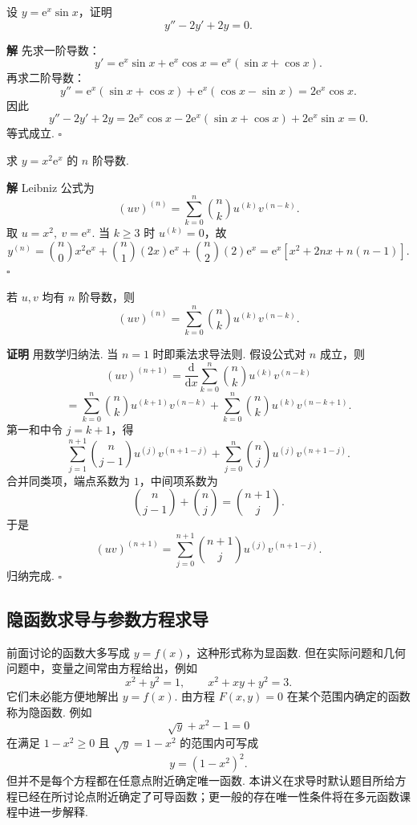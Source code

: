 \documentclass[fontset=fandol]{ctexart}
\newenvironment{proofdetail}{\par\noindent\textbf{证明}\quad}{\hfill$\square$\par\vspace{0.8em}}
\newenvironment{solution}{\par\noindent\textbf{解}\quad}{\hfill$\square$\par\vspace{0.8em}}
\newcommand{\dd}{\mathrm{d}}
\newcommand{\ee}{\mathrm{e}}
\begin{document}
\begin{example}[验证二阶导数关系]
设 $y=\ee^x\sin x$，证明
\[
y''-2y'+2y=0.
\]
\end{example}
\begin{solution}
先求一阶导数：
\[
y'=\ee^x\sin x+\ee^x\cos x=\ee^x(\sin x+\cos x).
\]
再求二阶导数：
\[
y''=\ee^x(\sin x+\cos x)+\ee^x(\cos x-\sin x)=2\ee^x\cos x.
\]
因此
\[
y''-2y'+2y
=2\ee^x\cos x-2\ee^x(\sin x+\cos x)+2\ee^x\sin x=0.
\]
等式成立.
\end{solution}

\begin{example}[Leibniz 公式]
求 $y=x^2\ee^x$ 的 $n$ 阶导数.
\end{example}
\begin{solution}
Leibniz 公式为
\[
(uv)^{(n)}=\sum_{k=0}^n\binom nk u^{(k)}v^{(n-k)}.
\]
取 $u=x^2,\ v=\ee^x$. 当 $k\geq3$ 时 $u^{(k)}=0$，故
\[
y^{(n)}=\binom n0x^2\ee^x+\binom n1(2x)\ee^x+\binom n2(2)\ee^x
=\ee^x\left[x^2+2nx+n(n-1)\right].
\]
\end{solution}

\begin{theorem}[Leibniz 公式]
若 $u,v$ 均有 $n$ 阶导数，则
\[
(uv)^{(n)}=\sum_{k=0}^{n}\binom{n}{k}u^{(k)}v^{(n-k)}.
\]
\end{theorem}
\begin{proofdetail}
用数学归纳法. 当 $n=1$ 时即乘法求导法则. 假设公式对 $n$ 成立，则
\[
(uv)^{(n+1)}
=\frac{\dd}{\dd x}\sum_{k=0}^{n}\binom{n}{k}u^{(k)}v^{(n-k)}
\]
\[
=\sum_{k=0}^{n}\binom{n}{k}u^{(k+1)}v^{(n-k)}
+\sum_{k=0}^{n}\binom{n}{k}u^{(k)}v^{(n-k+1)}.
\]
第一和中令 $j=k+1$，得
\[
\sum_{j=1}^{n+1}\binom{n}{j-1}u^{(j)}v^{(n+1-j)}
+\sum_{j=0}^{n}\binom{n}{j}u^{(j)}v^{(n+1-j)}.
\]
合并同类项，端点系数为 $1$，中间项系数为
\[
\binom{n}{j-1}+\binom{n}{j}=\binom{n+1}{j}.
\]
于是
\[
(uv)^{(n+1)}=\sum_{j=0}^{n+1}\binom{n+1}{j}u^{(j)}v^{(n+1-j)}.
\]
归纳完成.
\end{proofdetail}

\subsection{隐函数求导与参数方程求导}

前面讨论的函数大多写成 $y=f(x)$，这种形式称为显函数. 但在实际问题和几何问题中，变量之间常由方程给出，例如
\[
x^2+y^2=1,\qquad x^2+xy+y^2=3.
\]
它们未必能方便地解出 $y=f(x)$. 由方程 $F(x,y)=0$ 在某个范围内确定的函数称为隐函数. 例如
\[
\sqrt{y}+x^2-1=0
\]
在满足 $1-x^2\geq0$ 且 $\sqrt{y}=1-x^2$ 的范围内可写成
\[
y=(1-x^2)^2.
\]
但并不是每个方程都在任意点附近确定唯一函数. 本讲义在求导时默认题目所给方程已经在所讨论点附近确定了可导函数；更一般的存在唯一性条件将在多元函数课程中进一步解释.
\end{document}
